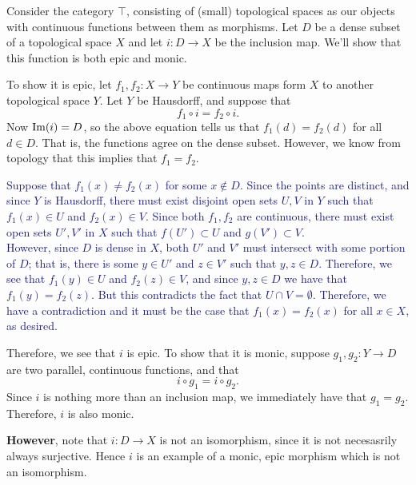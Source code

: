     \begin{example}
        Consider the category $\top$, consisting of (small)
        topological spaces as our objects with continuous functions between
        them as morphisms. Let $D$ be a dense subset of a topological space $X$ and let $i: D
        \to X$ be the inclusion map. We'll show that this function is both
        epic and monic.
    
        To show it is epic, let $f_1, f_2: X \to Y$ be continuous maps
        form $X$ to another topological space $Y$. Let $Y$ be Hausdorff,
        and suppose that 
        \[
            f_1 \circ i = f_2 \circ i.
        \]
        Now $\operatorname{\rm{Im}}(i) = D$, so the above equation tells us that $f_1(d) =
        f_2(d)$ for all $d \in D$. That is, the functions agree on the
        dense subset. However, we know from topology that this implies
        that $f_1 = f_2$.
        \begin{prf}
            \textcolor{MidnightBlue}{
                Suppose that $f_1(x) \ne f_2(x)$ for some $x \notin D$. Since the points are
                distinct, and since $Y$ is Hausdorff, there must exist disjoint open sets 
                $U, V$ in $Y$ such that $f_1(x) \in U$ and $f_2(x) \in V$. Since both $f_1, f_2$ are
                continuous, there must exist open sets $U', V'$ in $X$ such that 
                $f(U') \subset U$ and $g(V') \subset V$. 
                \\
                \indent However, since $D$ is dense in $X$,
                both $U'$ and $V'$ must intersect with some portion of $D$; that is, 
                there is some $y \in U'$ and $z \in V'$ such that $y, z \in D$. Therefore, 
                we see that $f_1(y) \in U$ and $f_2(z) \in V$, and since
                $y, z \in D$ we have that $f_1(y) = f_2(z)$. But this contradicts the fact that $U \cap V =
                \emptyset.$ Therefore, we have a contradiction and it must be the case that 
                $f_1(x) = f_2(x)$ for all $x \in X$, as desired.
            }
        \end{prf}
        \noindent Therefore, we see that $i$ is epic. To show that it is
        monic, suppose $g_1, g_2: Y \to D$ are two 
        parallel, continuous functions, and that 
        \[
            i \circ g_1 = i \circ g_2.
        \]
        Since $i$ is nothing more than an inclusion map, we immediately
        have that $g_1 = g_2$. Therefore, $i$ is also monic.
    
        \textbf{However}, note that $i: D \to X$ is not an isomorphism, since 
        it is not necesasrily always surjective.
        Hence $i$ is an example
        of a monic, epic morphism which is not an isomorphism. 
        
    \end{example} 

